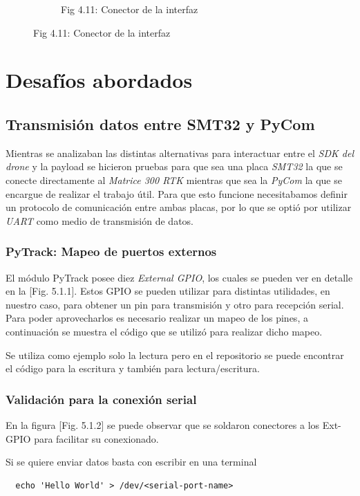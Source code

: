 \documentclass[12pt]{article}
\begin{document}
\begin{figure}[ht]
\begin{subfigure}[b]{0.45\linewidth}
    \caption{Fig 4.11: Conector de la interfaz}
  \end{subfigure}
\end{figure}

\vspace*{200pt}
\newpage
\section{Desafíos abordados}

\subsection{Transmisión datos entre SMT32 y PyCom}
Mientras se analizaban las distintas alternativas para interactuar entre el \textit{SDK del drone} y la payload se hicieron pruebas para que sea una placa \textit{SMT32} la que se conecte directamente al \textit{Matrice 300 RTK} mientras que sea la \textit{PyCom} la que se encargue de  realizar el trabajo útil. Para que esto funcione necesitabamos definir un protocolo de comunicación entre ambas placas, por lo que se optió por utilizar \textit{UART} como medio de transmisión de datos.

\subsubsection{PyTrack: Mapeo de puertos externos}
El módulo PyTrack posee diez \textit{External GPIO}, los cuales se pueden ver en detalle en la [Fig. 5.1.1]. Estos GPIO se pueden utilizar para distintas utilidades, en nuestro caso, para obtener un pin para transmisión y otro para recepción serial. Para poder aprovecharlos es necesario realizar un mapeo de los pines, a continuación se muestra el código que se utilizó para realizar dicho mapeo.



Se utiliza como ejemplo solo la lectura pero en el repositorio se puede encontrar el código para la escritura y también para lectura/escritura.

\subsubsection{Validación para la conexión serial}

En la figura [Fig. 5.1.2] se puede observar que se soldaron conectores a los Ext-GPIO para facilitar su conexionado.

Si se quiere enviar datos basta con escribir en una terminal
\lstset{language=Bash}
\begin{lstlisting}
  echo 'Hello World' > /dev/<serial-port-name>
\end{lstlisting}
\end{document}
